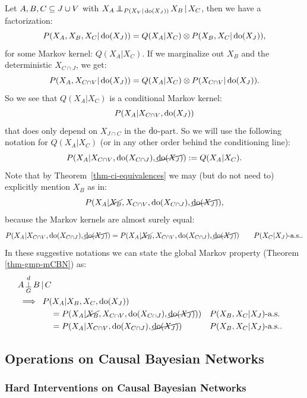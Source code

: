 \begin{Not}
    Let $A,B,C \subseteq J \cup V$ with $X_A \operatorname*{\perp\mkern-11mu\perp}_{P(X_V|\operatorname{do}(X_J))} X_B \operatorname*{|} X_C$, then we have a factorization:
    \[ P(X_A,X_B,X_C|\operatorname{do}(X_J)) = Q(X_A|X_C) \otimes P(X_B,X_C|\operatorname{do}(X_J)),\]
    for some Markov kernel: $Q(X_A|X_C)$. If we marginalize out $X_B$ and the deterministic $X_{C \cap J}$,
    we get:
    \[ P(X_A,X_{C\cap V}|\operatorname{do}(X_J)) = Q(X_A|X_C) \otimes P(X_{C\cap V}|\operatorname{do}(X_J)).\]
    So we see that $Q(X_A|X_C)$ is a conditional Markov kernel:
    \[P(X_A|X_{C\cap V},\operatorname{do}(X_J)) \]
    that does only depend on $X_{J \cap C}$ in the $\operatorname{do}$-part.
    So we will use the following notation for $Q(X_A|X_C)$ (or in any other order behind the conditioning line):
    \[ P(X_A|X_{C \cap V},\operatorname{do}(X_{C \cap J}),\cancel{\operatorname{do}(X_J)}) := Q(X_A|X_C).  \]
    Note that by Theorem~\ref{thm-ci-equivalences} we may (but do not need to) explicitly mention $X_B$ as in:
    \[ P(X_A|\cancel{X_B},X_{C \cap V},\operatorname{do}(X_{C \cap J}),\cancel{\operatorname{do}(X_J)}),  \]
    because the Markov kernels are almost surely equal:
  \[ P(X_A|X_{C \cap V},\operatorname{do}(X_{C \cap J}),\cancel{\operatorname{do}(X_J)}) = P(X_A|\cancel{X_B},X_{C \cap V},\operatorname{do}(X_{C \cap J}),\cancel{\operatorname{do}(X_J)}) \qquad P(X_C|X_J)\text{-a.s.}.\]
    In these suggestive notations we can state the global Markov property (Theorem \ref{thm-gmp-mCBN}) as:
    \begin{align*} 
    &A \operatorname*{\perp}^d_G B \operatorname*{|} C \\
    &\implies \; P(X_A|X_B,X_C,\operatorname{do}(X_J)) \\
      & \qquad\qquad = P(X_A|\cancel{X_B},X_{C \cap V},\operatorname{do}(X_{C \cap J}),\cancel{\operatorname{do}(X_J)})) && P(X_B,X_C|X_J)\text{-a.s.} \\
      & \qquad\qquad = P(X_A|X_{C \cap V},\operatorname{do}(X_{C \cap J}),\cancel{\operatorname{do}(X_J)}) && P(X_B,X_C|X_J)\text{-a.s.}. 
    \end{align*}
\end{Not}




\subsection{Operations on Causal Bayesian Networks}
\subsubsection{Hard Interventions on Causal Bayesian Networks}

